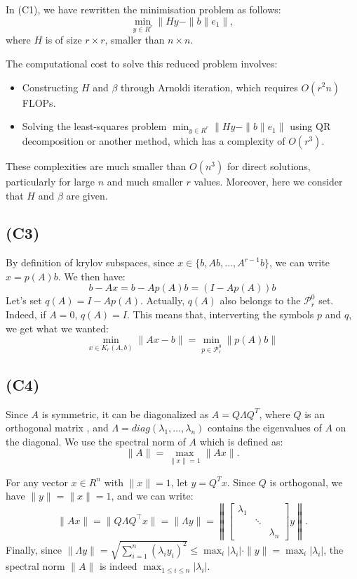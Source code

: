 \documentclass{article}
\begin{document}
In (C1), we have rewritten the minimisation problem as follows: 
\[
\min_{y \in R^r} \left\| H y - \|b\| e_{1} \right\|,
\]
where $ H $ is of size $ r \times r $, smaller than $ n \times n $.


The computational cost to solve this reduced problem involves:
\begin{itemize}
    \item Constructing $ H $ and $ \beta $ through Arnoldi iteration, which requires $ O(r^2 n) $ FLOPs.
    \item Solving the least-squares problem $ \min_{y \in R^r} \| H y - \|b\| e_1 \| $ using QR decomposition or another method,
     which has a complexity of $ O(r^3) $.
\end{itemize}
These complexities are much smaller than $ O(n^3) $ for direct solutions, particularly for large $ n $ and much smaller $ r $ values. Moreover, 
here we consider that $H$ and $\beta$ are given. 

\subsection*{(C3)}
By definition of krylov subspaces, since $x \in \{b, Ab, ..., A^{r-1}b\}$, 
we can write $x=p(A)b$. We then have:
\[
b -Ax = b - A p(A)b = (I-A p(A))b 
\]
Let's set $q(A) = I-A p(A)$. Actually, $q(A)$ also belongs to the
 $\mathcal{P}_r^0$ set. Indeed, if $A = 0$, $q(A) = I$. This means that, interverting the symbols $p$ and $q$, 
 we get what we wanted: 
 \[
\min_{x \in K_r(A, b)} \|Ax - b\|  = \min_{p \in \mathcal{P}_r^0} \|p(A)b\|
 \]

\subsection*{(C4)}
Since $ A $ is symmetric, it can be diagonalized as $ A = Q \Lambda Q^T $, 
where $ Q $ is an orthogonal matrix , and $ \Lambda = diag(\lambda_1, \dots, \lambda_n) $ contains the eigenvalues of $ A $ on the diagonal.
We use the spectral norm of $ A $ which is defined as:
   \[
   \|A\| = \max_{\|x\| = 1} \|Ax\|.
   \]

For any vector $ x \in R^n $ with $ \|x\| = 1 $, let $ y = Q^T x $. 
Since $ Q $ is orthogonal, we have $ \|y\| = \|x\| = 1 $, and we can write:
 \[
\|Ax\| = \|Q \Lambda Q^\top x\| = \|\Lambda y\| = \left\|
   [\begin{array}{ccc}
        \lambda_1 & &  \\
         & \ddots &  \\
         & & \lambda_n 
    \end{array} ] y\right \|.
\]
Finally, since $ \|\Lambda y\| = \sqrt{\sum_{i=1}^n (\lambda_i y_i)^2} \leq \max_{i} |\lambda_i| \cdot \|y\| = \max_{i} |\lambda_i| $, the spectral norm $ \|A\| $ is indeed $ \max_{1 \leq i \leq n} |\lambda_i| $.
\end{document}
